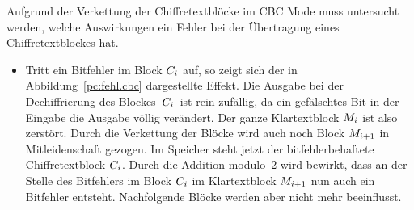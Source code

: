 Aufgrund der Verkettung der Chiffretextblöcke im CBC Mode muss untersucht werden, welche Auswirkungen ein Fehler bei der Übertragung eines Chiffretextblockes
hat.
\begin{itemize}
  \item Tritt ein Bitfehler im Block $C_i$ auf, so zeigt sich der in Abbildung~\ref{pc:fehl.cbc} dargestellte Effekt. Die Ausgabe bei der Dechiffrierung
  des Blockes \,$C_i$ \,ist rein zufällig, da ein gefälschtes Bit in der Eingabe die Ausgabe völlig verändert. Der ganze Klartextblock $M_i$ ist
  also zerstört. Durch die Verkettung der Blöcke wird auch noch Block $M_{i+1}$ in Mitleidenschaft gezogen. Im Speicher steht jetzt der
  bitfehlerbehaftete Chiffretextblock $C_i$. Durch die Addition modulo~2  wird bewirkt, dass an der Stelle des Bitfehlers im Block $C_i$ im
  Klartextblock $M_{i+1}$ nun auch ein Bitfehler entsteht. Nachfolgende Blöcke werden aber nicht mehr beeinflusst.
\end{itemize}

